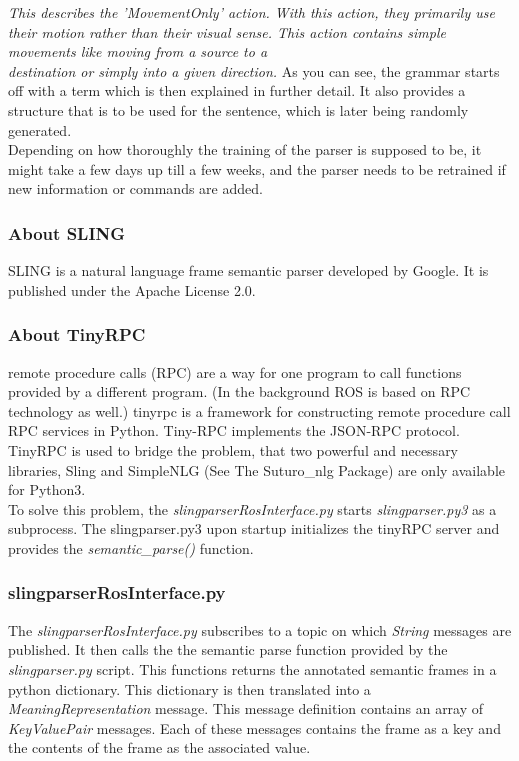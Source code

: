 \documentclass[main.tex]{subfiles}
\begin{document}
            \textit{This describes the 'MovementOnly' action.
                With this action, they primarily use their motion rather than their visual sense. This action contains simple movements like moving from a source to a\\ destination or simply into a given direction.}            
            As you can see, the grammar starts off with a term which is then explained in further detail. It also provides a structure that is to be used for the sentence, which is later being randomly generated.\\ 
            Depending on how thoroughly the training of the parser is supposed to be, it might take a few days up till a few weeks, and the parser needs to be retrained if new information or commands are added.
        
        \subsubsection{About SLING}
            SLING is a natural language frame semantic parser developed by Google. It is published under the Apache License 2.0.
        \subsubsection{About TinyRPC}
             remote procedure calls (RPC) are a way for one program to call functions provided by a different program. (In the background ROS is based on RPC technology as well.) tinyrpc is a framework for constructing remote procedure call RPC services in Python. Tiny-RPC implements the JSON-RPC protocol.\\
             TinyRPC is used to bridge the problem, that two powerful and necessary libraries, Sling and SimpleNLG (See The Suturo\_nlg Package) are only available for Python3.\\
             To solve this problem, the \textit{slingparserRosInterface.py} starts \textit{slingparser.py3} as a subprocess. The slingparser.py3 upon startup initializes the tinyRPC server and provides the \textit{semantic\_parse()} function.
        \subsubsection[slingparserros]{slingparserRosInterface.py}
            The \textit{slingparserRosInterface.py} subscribes to a topic on which \textit{String} messages are published. It then calls the the semantic parse function provided by the \textit{slingparser.py} script. This functions returns the annotated semantic frames in a python dictionary. This dictionary is then translated into a \textit{MeaningRepresentation} message. This message definition contains an array of \textit{KeyValuePair} messages. Each of these messages contains the frame as a key and the contents of the frame as the associated value.
\end{document}
